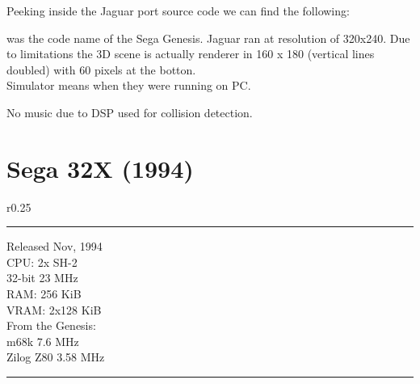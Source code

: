 \par
Peeking inside the Jaguar port source code we can find the following:\\
\par
{}
\par
{} was the code name of the Sega Genesis. Jaguar ran at resolution of 320x240. Due to limitations the 3D scene is actually renderer in 160 x 180 (vertical lines doubled) with 60 pixels at the botton.\\
Simulator means when they were running on PC.
\par
No music due to DSP used for collision detection.\\





\section{Sega 32X (1994)}

\begin{wrapfigure}[15]{r}{0.25\textwidth}{\centering {}}
\hrule 
\bigskip
   Released Nov, 1994\\
   CPU: 2x SH-2 \\
   32-bit 23 MHz\\
   RAM: 256 KiB\\
   VRAM: 2x128 KiB\\

   From the Genesis:\\
   m68k 7.6 MHz\\
   Zilog Z80 3.58 MHz\\
\hrule 
\end{wrapfigure}


